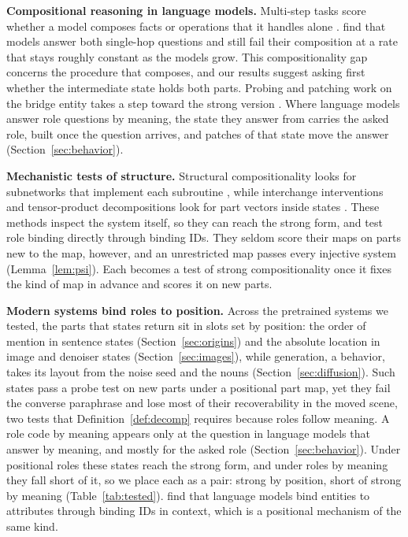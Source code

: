 \documentclass[10pt]{article}
\theoremstyle{plain}
\theoremstyle{remark}
\begin{document}
\textbf{Compositional reasoning in language models.} Multi-step tasks score whether a model composes facts or operations that it handles alone \citep{dziri2023,press2023}. \citet{press2023} find that models answer both single-hop questions and still fail their composition at a rate that stays roughly constant as the models grow. This compositionality gap concerns the procedure that composes, and our results suggest asking first whether the intermediate state holds both parts. Probing and patching work on the bridge entity takes a step toward the strong version \citep{yang2024latent,biran2024hopping}. Where language models answer role questions by meaning, the state they answer from carries the asked role, built once the question arrives, and patches of that state move the answer (Section~\ref{sec:behavior}).

\textbf{Mechanistic tests of structure.} Structural compositionality looks for subnetworks that implement each subroutine \citep{lepori2023}, while interchange interventions and tensor-product decompositions look for part vectors inside states \citep{geiger2021,geiger2024das,mccoy2019}. These methods inspect the system itself, so they can reach the strong form, and \citet{feng2024} test role binding directly through binding IDs. They seldom score their maps on parts new to the map, however, and an unrestricted map passes every injective system (Lemma~\ref{lem:psi}). Each becomes a test of strong compositionality once it fixes the kind of map in advance and scores it on new parts.

\textbf{Modern systems bind roles to position.} Across the pretrained systems we tested, the parts that states return sit in slots set by position: the order of mention in sentence states (Section~\ref{sec:origins}) and the absolute location in image and denoiser states (Section~\ref{sec:images}), while generation, a behavior, takes its layout from the noise seed and the nouns (Section~\ref{sec:diffusion}). Such states pass a probe test on new parts under a positional part map, yet they fail the converse paraphrase and lose most of their recoverability in the moved scene, two tests that Definition~\ref{def:decomp} requires because roles follow meaning. A role code by meaning appears only at the question in language models that answer by meaning, and mostly for the asked role (Section~\ref{sec:behavior}). Under positional roles these states reach the strong form, and under roles by meaning they fall short of it, so we place each as a pair: strong by position, short of strong by meaning (Table~\ref{tab:tested}). \citet{feng2024} find that language models bind entities to attributes through binding IDs in context, which is a positional mechanism of the same kind.
\end{document}
